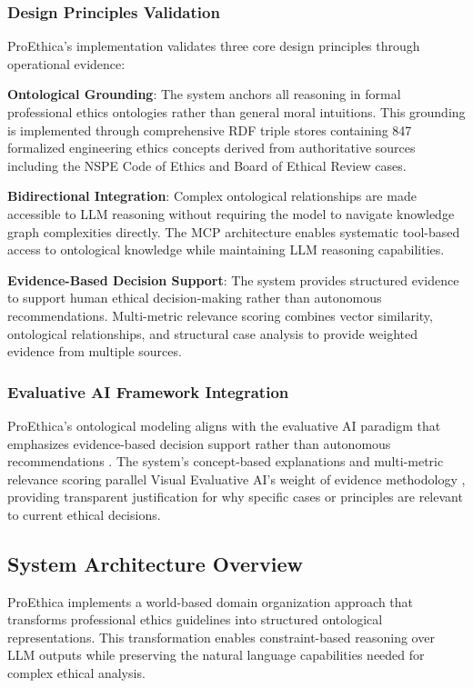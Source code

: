 \subsubsection{Design Principles Validation}

ProEthica's implementation validates three core design principles through operational evidence:

\textbf{Ontological Grounding}: The system anchors all reasoning in formal professional ethics ontologies rather than general moral intuitions. This grounding is implemented through comprehensive RDF triple stores containing 847 formalized engineering ethics concepts derived from authoritative sources including the NSPE Code of Ethics and Board of Ethical Review cases.

\textbf{Bidirectional Integration}: Complex ontological relationships are made accessible to LLM reasoning without requiring the model to navigate knowledge graph complexities directly. The MCP architecture enables systematic tool-based access to ontological knowledge while maintaining LLM reasoning capabilities.

\textbf{Evidence-Based Decision Support}: The system provides structured evidence to support human ethical decision-making rather than autonomous recommendations. Multi-metric relevance scoring combines vector similarity, ontological relationships, and structural case analysis to provide weighted evidence from multiple sources.

\subsubsection{Evaluative AI Framework Integration}

ProEthica's ontological modeling aligns with the evaluative AI paradigm that emphasizes evidence-based decision support rather than autonomous recommendations \cite{miller2023}. The system's concept-based explanations and multi-metric relevance scoring parallel Visual Evaluative AI's weight of evidence methodology \cite{le2024}, providing transparent justification for why specific cases or principles are relevant to current ethical decisions.

\subsection{System Architecture Overview}

ProEthica implements a world-based domain organization approach that transforms professional ethics guidelines into structured ontological representations. This transformation enables constraint-based reasoning over LLM outputs while preserving the natural language capabilities needed for complex ethical analysis.

